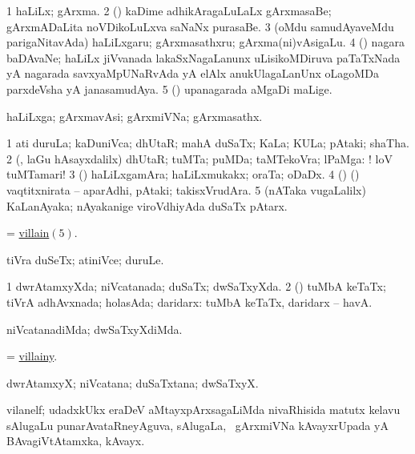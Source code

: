 \bentry
{} 
\gl{\nA}
\expl{}
\bmng
\bnum
\num{1} haLiLx; gArxma. 
\num{2} (\ame) kaDime adhikAragaLuLaLx gArxmasaBe; gArxmADaLita noVDikoLuLxva saNaNx purasaBe. 
\num{3} (oMdu samudAyaveMdu parigaNitavAda) haLiLxgaru; gArxmasathxru; gArxma(ni)vAsigaLu. 
\num{4} (\birx) nagara baDAvaNe; haLiLx jiVvanada lakaSxNagaLanunx uLisikoMDiruva paTaTxNada yA nagarada savxyaMpUNaRvAda yA elAlx anukUlagaLanUnx oLagoMDa parxdeVsha yA janasamudAya. 
\num{5} (\AseTxrXV) upanagarada aMgaDi maLige. 
\enum
\emng
\eentry

\bentry
{} 
\gl{\nA}
\expl{}
\bmng
 haLiLxga; gArxmavAsi; gArxmiVNa; gArxmasathx. 
\emng
\eentry

\bentry
{} 
\gl{\nA}
\expl{}
\bmng
\bnum
\num{1} ati duruLa; kaDuniVca; dhUtaR; mahA duSaTx; KaLa; KULa; pAtaki; shaTha. 
\num{2} (\AmA, laGu hAsayxdalilx) dhUtaR; tuMTa; puMDa; taMTekoVra; lPaMga: ! loV tuMTamari! 
\num{3} (\pArxparx) haLiLxgamAra; haLiLxmukakx; oraTa; oDaDx. 
\num{4} (\birx) (\AmA) vaqtitxnirata -- aparAdhi, pAtaki; takisxVrudAra. 
\hypertarget{villain(5)}{} 
\num{5} (nATaka \mo vugaLalilx) KaLanAyaka; nAyakanige viroVdhiyAda duSaTx pAtarx. 
\enum
\emng

\noindent 
\gl{\pagu}
\expl{}
\bmng
{} = \hyperlink{villain(5)}{villain\((5)\)}. 
\emng
\eentry

\bentry
{} 
\gl{\nA}
\expl{}
\bmng
 tiVra duSeTx; atiniVce; duruLe. 
\emng
\eentry

\bentry
{} 
\gl{\gu}
\expl{}
\bmng
\bnum
\num{1} dwrAtamxyXda; niVcatanada; duSaTx; dwSaTxyXda. 
\num{2} (\AmA) tuMbA keTaTx; tiVrA adhAvxnada; holasAda; daridarx:  tuMbA keTaTx, daridarx -- havA. 
\enum
\emng
\eentry

\bentry
{} 
\gl{\kirxvi}
\expl{}
\bmng
 niVcatanadiMda; dwSaTxyXdiMda. 
\emng
\eentry

\bentry
{} 
\gl{\nA}
\expl{}
\bmng
 = \hyperlink{villainy}{villainy}. 
\emng
\eentry

\bentry
{} 
\gl{\nA}
\bmng
 dwrAtamxyX; niVcatana; duSaTxtana; dwSaTxyX. 
\emng
\eentry

\bentry
{} 
\gl{\nA}
\expl{}
\bmng
 vilanelf; udadxkUkx eraDeV aMtayxpArxsagaLiMda nivaRhisida matutx kelavu sAlugaLu punarAvataRneyAguva,  sAlugaLa, \sA\ gArxmiVNa kAvayxrUpada yA BAvagiVtAtamxka, kAvayx. 
\emng
\eentry

